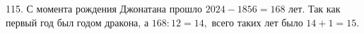 115. С момента рождения Джонатана прошло $2024-1856=168$ лет. Так как первый год был годом дракона, а $168:12=14,$  всего таких лет было $14+1=15.$\\
